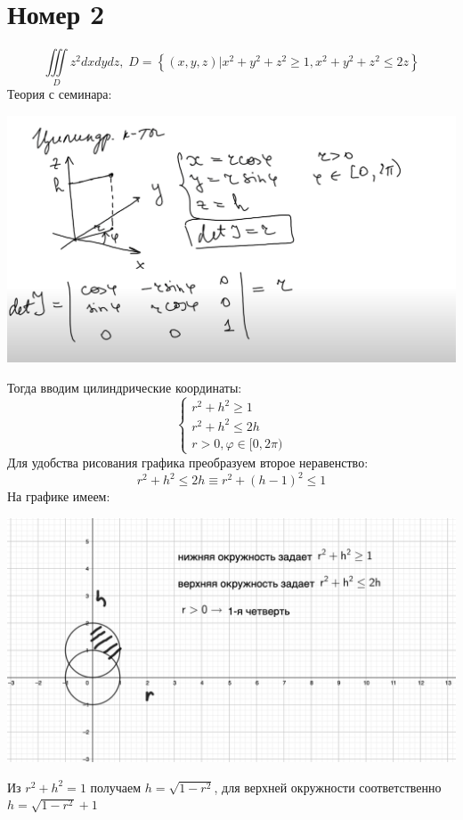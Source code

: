 \documentclass[a4paper,12pt]{article}
\begin{document}
\section*{Номер 2}
\[
\iiint\limits_D  z^2 dxdydz, \; D = \left\{ (x, y, z) \big| x^2 + y^2 + z^2 \geq 1, x^2 + y^2 + z^2 \leq 2z \right\}
\]
Теория с семинара:
\begin{center}
\includegraphics[scale=0.4]{3.png}
\end{center}
Тогда вводим цилиндрические координаты:
\[
\begin{cases}
r^2 + h^2 \geq 1 \\
r^2 + h^2 \leq 2h \\
r > 0, \varphi \in [0, 2\pi)
\end{cases}
\]
Для удобства рисования графика преобразуем второе неравенство:
\[
r^2 + h^2 \leq 2h \equiv r^2 + (h - 1)^2 \leq 1
\]
На графике имеем:
\begin{center}
\includegraphics[scale=0.3]{4.png}
\end{center}
Из $r^2 + h^2 = 1$ получаем $h = \sqrt{1 - r^2}$, для верхней окружности соответственно $h = \sqrt{1 -r^2} + 1$
\\
\end{document}
